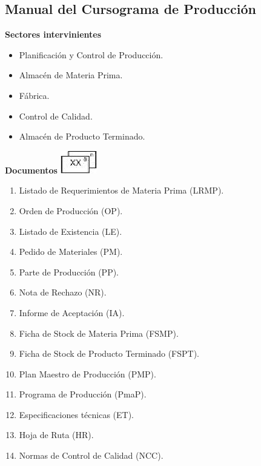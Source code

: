 \pagebreak
\subsection{Manual del Cursograma de Producci\'on}

\begin{center}\textbf{Sectores intervinientes}\end{center}
\begin{itemize}
  \item Planificaci\'on y Control de Producci\'on.
  \item Almac\'en de Materia Prima.
  \item F\'abrica.
  \item Control de Calidad.
  \item Almac\'en de Producto Terminado.
\end{itemize}

\begin{center}
  \textbf{Documentos}
  \includegraphics{./Images/Simbolos/simbolo-Documentos.png}
\end{center}
\begin{enumerate}
  \item Listado de Requerimientos de Materia Prima (LRMP).
  \item Orden de Producci\'on (OP).
  \item Listado de Existencia (LE).
  \item Pedido de Materiales (PM).
  \item Parte de Producci\'on (PP).
  \item Nota de Rechazo (NR).
  \item Informe de Aceptaci\'on (IA).
  \item Ficha de Stock de Materia Prima (FSMP).
  \item Ficha de Stock de Producto Terminado (FSPT).
  \item Plan Maestro de Producci\'on (PMP).
  \item Programa de Producci\'on (PmaP).
  \item Especificaciones t\'ecnicas (ET).
  \item Hoja de Ruta (HR).
  \item Normas de Control de Calidad (NCC).
\end{enumerate}

